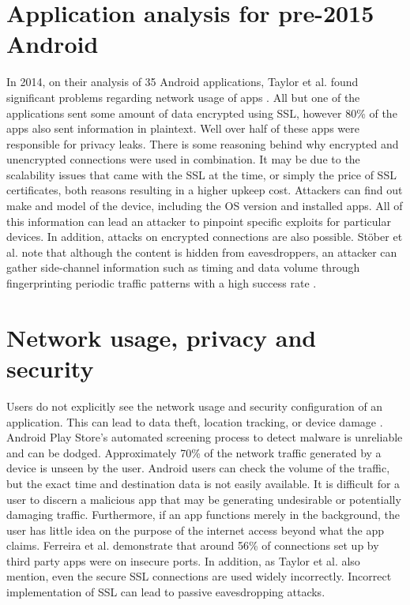 \documentclass[
  a4paper,  %
  twoside,  %
  bibliography=totoc,
  headsepline,
  cleardoublepage=empty,
  parskip=half,
  draft=false,
  open=any
]{scrbook}
\begin{document}
\section{Application analysis for pre-2015 Android}
In 2014, on their analysis of 35 Android applications, Taylor et al. found significant problems regarding network usage of apps \cite{taylor2014}. All but one of the applications sent some amount of data encrypted using SSL, however 80\% of the apps also sent information in plaintext. Well over half of these apps were responsible for privacy leaks. There is some reasoning behind why encrypted and unencrypted connections were used in combination. It may be due to the scalability issues that came with the SSL at the time, or simply the price of SSL certificates, both reasons resulting in a higher upkeep cost. Attackers can find out make and model of the device, including the OS version and installed apps. All of this information can lead an attacker to pinpoint specific exploits for particular devices. In addition, attacks on encrypted connections are also possible. Stöber et al. note that although the content is hidden from eavesdroppers, an attacker can gather side-channel information such as timing and data volume through fingerprinting periodic traffic patterns with a high success rate \cite{stoeber2013}. 

\section{Network usage, privacy and security}
Users do not explicitly see the network usage and security configuration of an application. This can lead to data theft, location tracking, or device damage \cite{ferreira2015}. Android Play Store's automated screening process to detect malware is unreliable and can be dodged. Approximately 70\% of the network traffic generated by a device is unseen by the user. Android users can check the volume of the traffic, but the exact time and destination data is not easily available. It is difficult for a user to discern a malicious app that may be generating undesirable or potentially damaging traffic. Furthermore, if an app functions merely in the background, the user has little idea on the purpose of the internet access beyond what the app claims. Ferreira et al. demonstrate that around 56\% of connections set up by third party apps were on insecure ports. In addition, as Taylor et al. also mention, even the secure SSL connections are used widely incorrectly. Incorrect implementation of SSL can lead to passive eavesdropping attacks.
\end{document}
